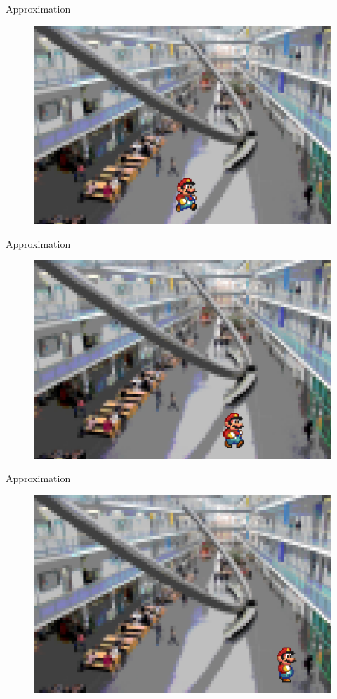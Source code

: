 \documentclass[9pt,pdftex]{beamer}
\begin{document}
\begin{frame}{Approximation}
\begin{figure}
\includegraphics[width=0.8\linewidth]{MI_slides_mario_f3}
\addtocounter{framenumber}{-1}
\end{figure}
\end{frame}

\begin{frame}{Approximation}
\begin{figure}
\includegraphics[width=0.8\linewidth]{MI_slides_mario_f4}
\addtocounter{framenumber}{-1}
\end{figure}
\end{frame}

\begin{frame}{Approximation}
\begin{figure}
\includegraphics[width=0.8\linewidth]{MI_slides_mario_f5}
\addtocounter{framenumber}{-1}
\end{figure}
\end{frame}
\end{document}
